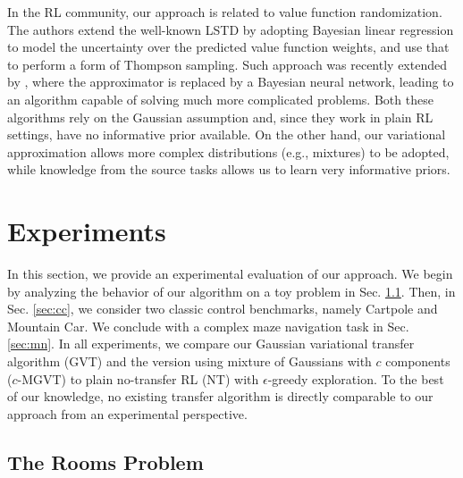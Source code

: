 \documentclass{article}
\begin{document}
In the RL community, our approach is related to value function randomization\cite{osband2014generalization}. The authors extend the well-known LSTD \cite{boyan1999least} by adopting Bayesian linear regression to model the uncertainty over the predicted value function weights, and use that to perform a form of Thompson sampling. Such approach was recently extended by \cite{azizzadenesheli2018efficient}, where the approximator is replaced by a Bayesian neural network, leading to an algorithm capable of solving much more complicated problems. Both these algorithms rely on the Gaussian assumption and, since they work in plain RL settings, have no informative prior available. On the other hand, our variational approximation allows more complex distributions (e.g., mixtures) to be adopted, while knowledge from the source tasks allows us to learn very informative priors.

\section{Experiments}

In this section, we provide an experimental evaluation of our approach. We begin by analyzing the behavior of our algorithm on a toy problem in Sec. \ref{sec:gw}. Then, in Sec. \ref{sec:cc}, we consider two classic control benchmarks, namely Cartpole and Mountain Car. We conclude with a complex maze navigation task in Sec. \ref{sec:mn}. In all experiments, we compare our Gaussian variational transfer algorithm (GVT) and the version using mixture of Gaussians with $c$ components ($c$-MGVT) to plain no-transfer RL (NT) with $\epsilon$-greedy exploration. To the best of our knowledge, no existing transfer algorithm is directly comparable to our approach from an experimental perspective. 

\subsection{The Rooms Problem} \label{sec:gw}
\end{document}
